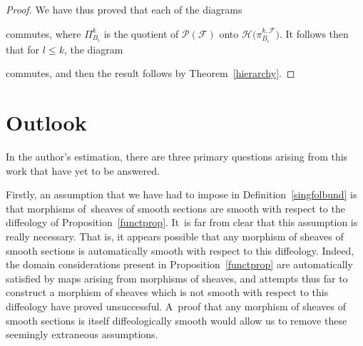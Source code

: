 \documentclass[10pt,a4paper]{amsart}
\numberwithin{equation}{section}
\def\id{\operatorname{id}}
\def\FF{{\mathcal{F}}}
\def\HH{{\mathcal{H}}}
\def\PP{{\mathcal{P}}}
\begin{document}
\begin{proof}
We have thus proved that each of the diagrams\vspace{-1ex}
\begin{center}
\end{center}
commutes, where $\Pi_{B_{i}}^{k}$ is the quotient of $\PP(\FF)$ onto $\HH\big(\pi_{B_{i}}^{k,\FF}\big)$. It follows then that for $l\leq k$, the diagram\vspace{-1ex}
\begin{center}
\end{center}
commutes, and then the result follows by Theorem~\ref{hierarchy}.
\end{proof}

\section{Outlook}\label{sec5}

In the author's estimation, there are three primary questions arising from this work that have yet to be answered.

Firstly, an assumption that we have had to impose in Definition~\ref{singfolbund} is that morphisms of~sheaves of smooth sections are smooth with respect to the diffeology of Proposition~\ref{functprop}. It~is far from clear that this assumption is really necessary. That is, it appears possible that any morphism of sheaves of smooth sections is automatically smooth with respect to this diffeology. Indeed, the domain considerations present in Proposition~\ref{functprop} are automatically satisfied by maps arising from morphisms of sheaves, and attempts thus far to construct a morphism of sheaves which is not smooth with respect to this diffeology have proved unsuccessful. A~proof that any morphism of sheaves of smooth sections is itself diffeologically smooth would allow us to remove these seemingly extraneous assumptions.
\end{document}
